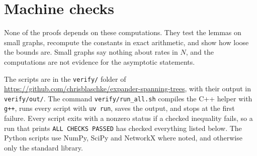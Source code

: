 \section{Machine checks}\label{app:checks}

None of the proofs depends on these computations. They test the lemmas on small graphs, recompute the constants in exact arithmetic, and show how loose the bounds are. Small graphs say nothing about rates in $N$, and the computations are not evidence for the asymptotic statements.

The scripts are in the \texttt{verify/} folder of \url{https://github.com/chrisblaschke/expander-spanning-trees}, with their output in \texttt{verify/out/}. The command \texttt{verify/run\_all.sh} compiles the C++ helper with \texttt{g++}, runs every script with \texttt{uv run}, saves the output, and stops at the first failure. Every script exits with a nonzero status if a checked inequality fails, so a run that prints \texttt{ALL CHECKS PASSED} has checked everything listed below. The Python scripts use NumPy, SciPy and NetworkX where noted, and otherwise only the standard library.

